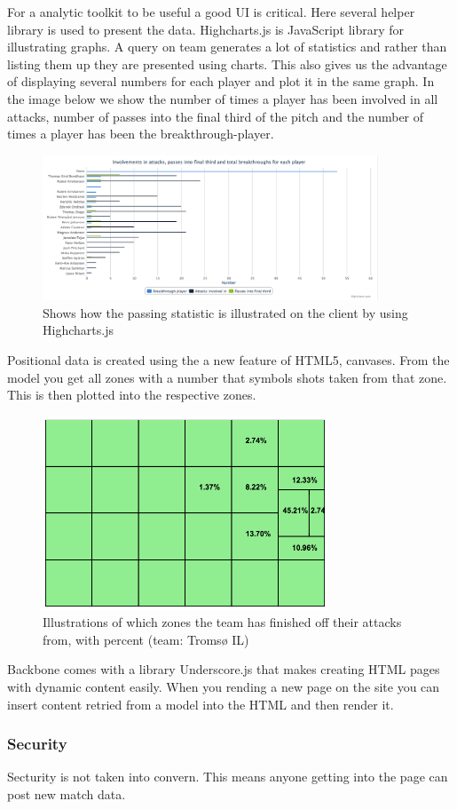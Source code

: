 For a analytic toolkit to be useful a good UI is critical. Here several helper library is used to present the data. Highcharts.js is JavaScript library for illustrating graphs. A query on team generates a lot of statistics and rather than listing them up they are presented using charts. This also gives us the advantage of displaying several numbers for each player and plot it in the same graph. In the image below we show the number of times a player has been involved in all attacks, number of passes into the final third of the pitch and the number of times a player has been the breakthrough-player.

\begin{figure}[ht!]
\centering
\includegraphics[width=100mm]{images/general/chart_passes.png}
\caption{Shows how the passing statistic is illustrated on the client by using Highcharts.js}
\label{overflow}
\end{figure}

Positional data is created using the a new feature of HTML5, canvases. From the model you get all zones with a number that symbols shots taken from that zone. This is then plotted into the respective zones. 

\begin{figure}[ht!]
\centering
\includegraphics[width=85mm]{images/general/finishing_zones.png}
\caption{Illustrations of which zones the team has finished off their attacks from, with percent (team: Tromsø IL)}
\label{overflow}
\end{figure}

Backbone comes with a library Underscore.js that makes creating HTML pages with dynamic content easily. When you rending a new page on the site you can insert content retried from a model into the HTML and then render it.



\subsubsection{Security}
Secturity is not taken into convern. This means anyone getting into the page can post new match data. 